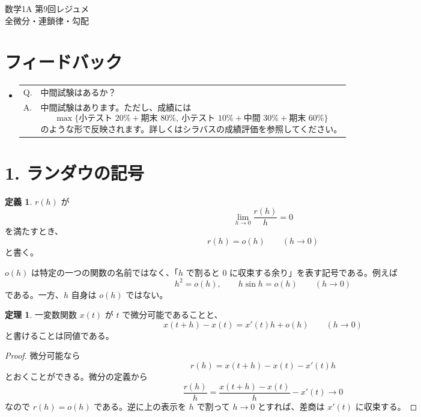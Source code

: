 \documentclass[a4paper,12pt]{article}
\makeatletter
\newcommand{\feedbackqa}[2]{%
\item[]
\begin{tabular}[t]{@{}p{1.8em}@{\hspace{0.4em}}p{\dimexpr\linewidth-2.2em\relax}@{}}
Q. & #1 \\
A. & #2
\end{tabular}
\par\smallskip\hrulefill
}
\makeatother
\begin{document}
\ifPDFTeX
\begin{CJK}{UTF8}{min}
\fi

\theoremstyle{definition}
\newtheorem*{definition}{定義}
\newtheorem*{theorem}{定理}
\newtheorem*{example}{例}
\newtheorem*{remark}{注意}
\renewcommand{\proofname}{\normalfont 証明}

\begin{center}
{\LARGE 数学1A 第9回レジュメ}\\[0.4em]
全微分・連鎖律・勾配
\end{center}

\section*{フィードバック}

\begin{itemize}[leftmargin=1.5em,itemsep=0.7em,topsep=0.3em]
\feedbackqa{中間試験はあるか？}{中間試験はあります。ただし、成績には
\[
\max\{\text{小テスト }20\%+\text{期末 }80\%,\
\text{小テスト }10\%+\text{中間 }30\%+\text{期末 }60\%\}
\]
のような形で反映されます。詳しくはシラバスの成績評価を参照してください。}
\end{itemize}

\section*{1. ランダウの記号}

\begin{definition}
$r(h)$ が
\[
\lim_{h\to0}\frac{r(h)}{h}=0
\]
を満たすとき、
\[
r(h)=o(h)\qquad (h\to0)
\]
と書く。
\end{definition}

$o(h)$ は特定の一つの関数の名前ではなく、「$h$ で割ると $0$ に収束する余り」を表す記号である。例えば
\[
h^2=o(h),\qquad h\sin h=o(h)\qquad (h\to0)
\]
である。一方、$h$ 自身は $o(h)$ ではない。

\begin{theorem}
一変数関数 $x(t)$ が $t$ で微分可能であることと、
\[
x(t+h)-x(t)=x'(t)h+o(h)\qquad (h\to0)
\]
と書けることは同値である。
\end{theorem}

\begin{proof}
微分可能なら
\[
r(h)=x(t+h)-x(t)-x'(t)h
\]
とおくことができる。微分の定義から
\[
\frac{r(h)}{h}
=\frac{x(t+h)-x(t)}{h}-x'(t)\longrightarrow0
\]
なので $r(h)=o(h)$ である。逆に上の表示を $h$ で割って $h\to0$ とすれば、差商は $x'(t)$ に収束する。
\end{proof}


\end{CJK}
\end{document}
